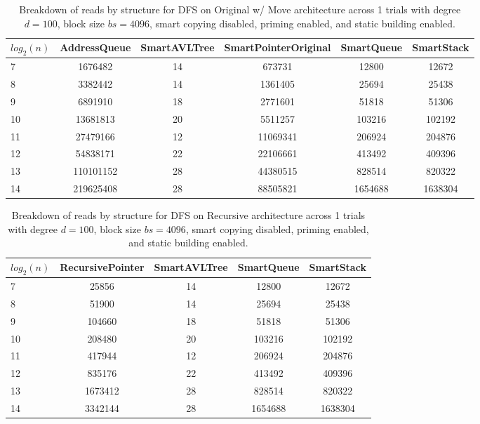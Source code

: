 \begin{table}[]
\centering
\begin{tabular}{|l|c|c|c|c|c|}
$log_2(n)$ & AddressQueue & SmartAVLTree & SmartPointerOriginal & SmartQueue & SmartStack \\ \hline
7 & 1676482 & 14 & 673731 & 12800 & 12672 \\ \hline
8 & 3382442 & 14 & 1361405 & 25694 & 25438 \\ \hline
9 & 6891910 & 18 & 2771601 & 51818 & 51306 \\ \hline
10 & 13681813 & 20 & 5511257 & 103216 & 102192 \\ \hline
11 & 27479166 & 12 & 11069341 & 206924 & 204876 \\ \hline
12 & 54838171 & 22 & 22106661 & 413492 & 409396 \\ \hline
13 & 110101152 & 28 & 44380515 & 828514 & 820322 \\ \hline
14 & 219625408 & 28 & 88505821 & 1654688 & 1638304 \\ \hline
\end{tabular}
\caption{Breakdown of reads by structure for DFS on Original w/ Move architecture across 1 trials with degree $d=100$, block size $bs=4096$, smart copying disabled, priming enabled, and static building enabled.}
    \label{tab:reads_by_structure_dfs_d100_bs4096_trials1_copiesfalse_primetrue_staticinsertiontrue_ptoriginal_movetrue}
\end{table}

\begin{table}[]
\centering
\begin{tabular}{|l|c|c|c|c|}
$log_2(n)$ & RecursivePointer & SmartAVLTree & SmartQueue & SmartStack \\ \hline
7 & 25856 & 14 & 12800 & 12672 \\ \hline
8 & 51900 & 14 & 25694 & 25438 \\ \hline
9 & 104660 & 18 & 51818 & 51306 \\ \hline
10 & 208480 & 20 & 103216 & 102192 \\ \hline
11 & 417944 & 12 & 206924 & 204876 \\ \hline
12 & 835176 & 22 & 413492 & 409396 \\ \hline
13 & 1673412 & 28 & 828514 & 820322 \\ \hline
14 & 3342144 & 28 & 1654688 & 1638304 \\ \hline
\end{tabular}
\caption{Breakdown of reads by structure for DFS on Recursive architecture across 1 trials with degree $d=100$, block size $bs=4096$, smart copying disabled, priming enabled, and static building enabled.}
    \label{tab:reads_by_structure_dfs_d100_bs4096_trials1_copiesfalse_primetrue_staticinsertiontrue_ptrecursive_movetrue}
\end{table}

